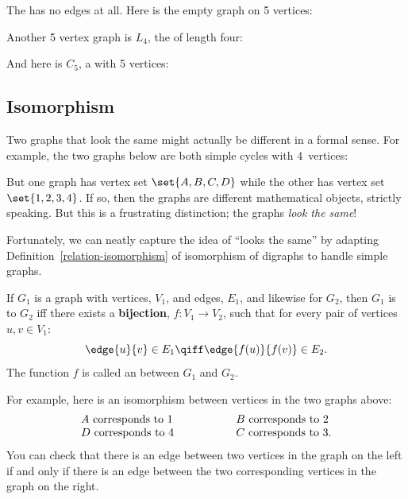 
The  has no edges at all.  Here is the empty graph on 5 vertices:


Another 5 vertex graph is $L_4$, the  of length four:


And here is $C_5$, a  with 5 vertices:


\subsection{Isomorphism}
Two graphs that look the same might actually be different in a formal sense.  For
example, the two graphs below are both simple cycles with 4~vertices:

But one graph has vertex set $\set{A, B, C, D}$ while the other has vertex set $\set{1,
2, 3, 4}$.  If so, then the graphs are different mathematical objects, strictly
speaking.  But this is a frustrating distinction; the graphs \emph{look the same}!

Fortunately, we can neatly capture the idea of ``looks the same'' by adapting
Definition~\ref{relation-isomorphism} of isomorphism of digraphs to handle simple
graphs.

\begin{definition}\label{simple-isomorphism}
  If $G_1$ is a graph with vertices, $V_1$, and edges, $E_1$, and likewise for $G_2$,
  then $G_1$ is  to $G_2$ iff there exists a \textbf{bijection}, $f:
  V_1 \to V_2$, such that for every pair of vertices $u, v \in V_1$:
\[
\edge{u}{v} \in E_1 \qiff \edge{f(u)}{f(v)} \in E_2.
\]
The function $f$ is called an  between $G_1$ and $G_2$.
\end{definition}

For example, here is an isomorphism between vertices in the two graphs above:
\[
\begin{array}{lll}
A \text{ corresponds to } 1 & \hspace{0.5in} & B \text{ corresponds to } 2 \\
D \text{ corresponds to } 4 & & C \text{ corresponds to } 3.
\end{array}
\]
You can check that there is an edge between two vertices in the graph on the left if
and only if there is an edge between the two corresponding vertices in the graph on the
right.

